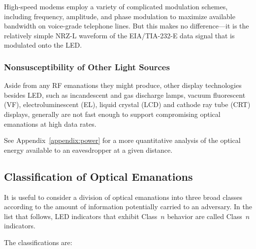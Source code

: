 \documentclass{acmtrans2e}
\begin{document}
High-speed modems employ a variety of complicated modulation schemes, including 
frequency, amplitude, and phase modulation to maximize available 
bandwidth on voice-grade telephone lines.  But this makes no
difference---it is the relatively simple NRZ-L waveform of the
EIA/TIA-232-E data signal that is modulated onto the LED.

\subsubsection{Nonsusceptibility of Other Light Sources}

Aside from any RF emanations they might produce, other display 
technologies besides LED, such as incandescent and gas discharge lamps, 
vacuum fluorescent (VF), electroluminescent (EL), liquid crystal (LCD) 
and cathode ray tube (CRT) displays, generally are not fast enough to
support compromising optical emanations at high data rates.

See Appendix~\ref{appendix:power} for a more quantitative analysis of the
optical energy available to an eavesdropper at a given distance.

\subsection{Classification of Optical Emanations}

It is useful to consider a division of optical emanations into three 
broad classes according to the amount of information potentially carried 
to an adversary.  In the list that follows, LED indicators that exhibit
Class~$n$ behavior are called Class~$n$ indicators.

The classifications are:
\end{document}
